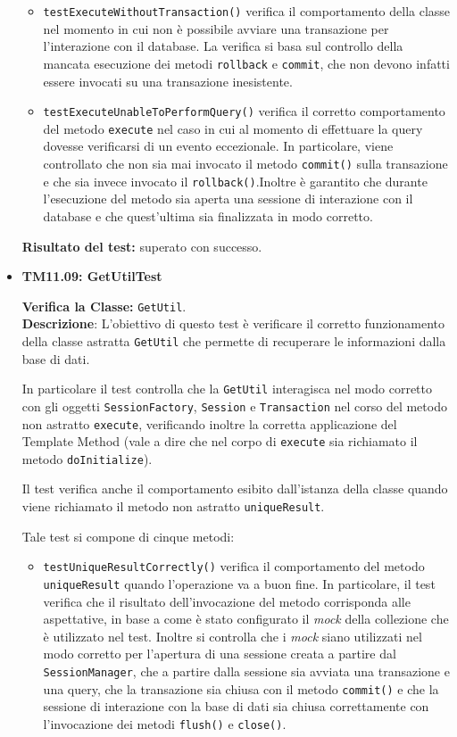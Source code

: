 \begin{itemize}
\begin{itemize}
\item \texttt{testExecuteWithoutTransaction()}
verifica il comportamento della classe nel momento in cui non è possibile avviare una transazione per l'interazione con il database.
La verifica si basa sul controllo della mancata esecuzione dei metodi \texttt{rollback} e \texttt{commit}, che non devono infatti essere invocati su una transazione inesistente.

\item \texttt{testExecuteUnableToPerformQuery()} verifica il corretto comportamento del metodo \texttt{execute} nel caso in cui al momento di effettuare la query dovesse verificarsi di un evento eccezionale. In particolare, viene controllato che non sia mai invocato il metodo \texttt{commit()} sulla transazione e che sia invece invocato il \texttt{rollback()}.Inoltre è garantito che durante l'esecuzione del metodo sia aperta una sessione di interazione con il database e che quest'ultima sia finalizzata in modo corretto. 
\end{itemize}
\textbf{Risultato del test:} superato con successo.

\item \textbf{TM11.09: GetUtilTest} 

\textbf{Verifica la Classe:} \texttt{GetUtil}.\\
\textbf{Descrizione}: L'obiettivo di questo test è verificare il corretto funzionamento della classe astratta \texttt{GetUtil} che permette di recuperare le informazioni dalla base di dati.

In particolare il test controlla che la \texttt{GetUtil} interagisca nel modo corretto con gli oggetti \texttt{SessionFactory}, \texttt{Session} e \texttt{Transaction} nel corso del metodo non astratto \texttt{execute}, verificando inoltre la corretta applicazione del  Template Method (vale a dire che nel corpo di \texttt{execute} sia richiamato il metodo \texttt{doInitialize}).

Il test verifica anche il comportamento esibito dall'istanza della classe quando viene richiamato il metodo non astratto \texttt{uniqueResult}.

Tale test si compone di cinque metodi:
\begin{itemize}
\item \texttt{testUniqueResultCorrectly()} verifica il comportamento del metodo \texttt{uniqueResult} quando l'operazione va a buon fine. In particolare, il test verifica che il risultato dell'invocazione del metodo corrisponda alle aspettative, in base a come è stato configurato il \textit{mock} della collezione che è utilizzato nel test.
Inoltre si controlla che i \textit{mock} siano utilizzati nel modo corretto per l'apertura di una sessione creata a partire dal \texttt{SessionManager}, che a partire dalla sessione sia avviata una transazione e una query, che la transazione sia chiusa con il metodo \texttt{commit()} e che la sessione di interazione con la base di dati sia chiusa correttamente con l'invocazione dei metodi \texttt{flush()} e \texttt{close()}. 


\end{itemize}
\end{itemize}
